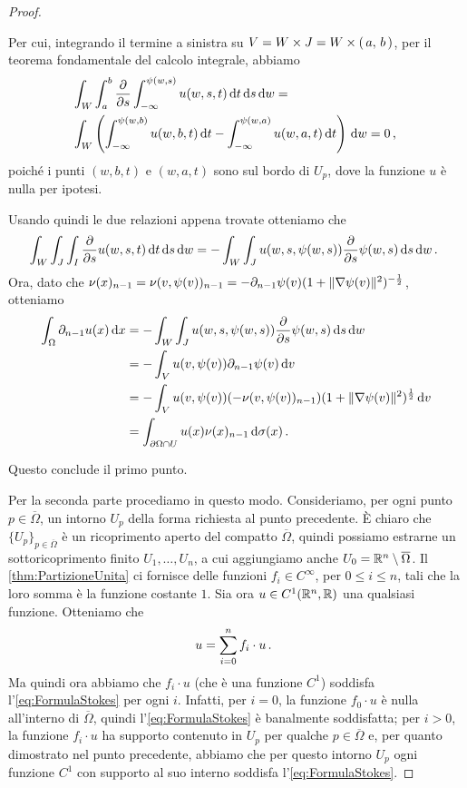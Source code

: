 \begin{proof}
\begin{description}
			Per cui, integrando il termine a sinistra su $V=W\times J=W\times \left(\,a,\,b\,\right)$, per il teorema fondamentale del
			calcolo integrale, abbiamo 
			\begin{align*}
				&\int_W \int_a^b \frac\partial{\partial s} \int_{-\infty}^{\psi(w,s)} u(w,s,t) \,\mathrm d t \,\mathrm d s \,\mathrm d w = \\
				&\int_W \left(\int_{-\infty}^{\psi(w,b)} u(w,b,t) \,\mathrm d t - \int_{-\infty}^{\psi(w,a)} u(w,a,t) \,\mathrm d t\right) \,\mathrm d w
				= 0\, \text{, }
			\end{align*}
			poiché i punti $(w,b,t)$ e $(w,a,t)$ sono sul bordo di $U_p$, dove la funzione $u$ è nulla per ipotesi. 
			
			Usando quindi le due relazioni appena trovate otteniamo che
			\[
				\int_W\int_J\int_I\frac\partial{\partial s} u(w,s,t) \,\mathrm d t \,\mathrm d s \,\mathrm d w =-\int_W \int_J u(w,s,\psi(w,s))\frac\partial{\partial s} \psi (w,s)\,\mathrm d s\,\mathrm d w\, \text{. }
			\]
			Ora, dato che $\nu(x)_{n-1}=\nu(v,\psi(v))_{n-1}=-\partial_{n-1}\psi(v)(1+\lVert\nabla\psi(v)\rVert^2)^{-\frac{1}{2}}$, otteniamo
			\begin{align*}
				\int_{\Omega} \partial_{n-1} u(x) \,\mathrm d x & = -\int_W \int_J u(w,s,\psi(w,s))\frac\partial{\partial s} \psi (w,s) \,\mathrm d s \,\mathrm d w\\
				& = -\int_V u(v,\psi(v))\partial_{n-1} \psi(v) \,\mathrm d v\\
				& = -\int_V u(v,\psi(v))(-\nu(v,\psi(v))_{n-1})(1+\lVert\nabla\psi(v)\rVert^2)^{\frac{1}{2}} \,\mathrm d v\\
				& = \int_{\partial \Omega \cap U} u(x)\nu(x)_{n-1} \,\mathrm d \sigma(x)\, \text{. }
			\end{align*}
	\end{description}
	Questo conclude il primo punto.
	
	Per la seconda parte procediamo in questo modo.
	Consideriamo, per ogni punto $p\in \overline\Omega$, un intorno $U_p$ della forma richiesta al punto precedente. È chiaro che $\{U_p\}_{p\in\overline\Omega}$ è un
	ricoprimento aperto del compatto $\overline\Omega$, quindi possiamo estrarne un sottoricoprimento finito $U_1,\dots,U_n$, a cui aggiungiamo anche
	$U_0=\mathbb R^n \setminus \overline\Omega$. Il \cref{thm:PartizioneUnita} ci fornisce delle funzioni $f_i\in C^{\infty}$, per $0\leq i \leq n$,
	tali che la loro somma è la funzione costante $1$.
	Sia ora $u\in C^1(\mathbb R^n,\mathbb R)$ una qualsiasi funzione. Otteniamo che
	\[
		u = \sum_{i=0}^n f_i\cdot u\, \text{. }
	\]
	Ma quindi ora abbiamo che $f_i \cdot u$ (che è una funzione $C^1$) soddisfa l'\cref{eq:FormulaStokes} per ogni $i$.
	Infatti, per $i=0$, la funzione $f_0\cdot u$ è nulla all'interno di $\overline\Omega$, quindi l'\cref{eq:FormulaStokes} è banalmente soddisfatta; per $i>0$, la funzione $f_i \cdot u$ ha supporto contenuto in $U_p$ per qualche $p\in \overline\Omega$ e, per quanto
	dimostrato nel punto precedente, abbiamo che per questo intorno $U_p$ ogni funzione $C^1$ con supporto al suo interno soddisfa l'\cref{eq:FormulaStokes}.
	

\end{proof}
